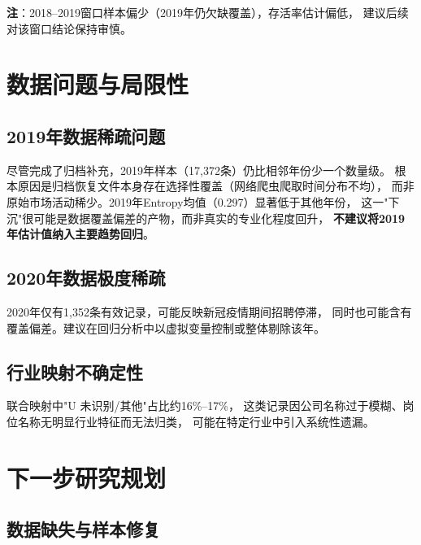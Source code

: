 \documentclass[12pt,a4paper]{ctexart}
\begin{document}
\textbf{注}：2018--2019窗口样本偏少（2019年仍欠缺覆盖），存活率估计偏低，
建议后续对该窗口结论保持审慎。

\section{数据问题与局限性}
\label{sec:data_issues}

\subsection{2019年数据稀疏问题}

尽管完成了归档补充，2019年样本（17,372条）仍比相邻年份少一个数量级。
根本原因是归档恢复文件本身存在选择性覆盖（网络爬虫爬取时间分布不均），
而非原始市场活动稀少。2019年Entropy均值（0.297）显著低于其他年份，
这一"下沉"很可能是数据覆盖偏差的产物，而非真实的专业化程度回升，
\textbf{不建议将2019年估计值纳入主要趋势回归}。

\subsection{2020年数据极度稀疏}

2020年仅有1,352条有效记录，可能反映新冠疫情期间招聘停滞，
同时也可能含有覆盖偏差。建议在回归分析中以虚拟变量控制或整体剔除该年。

\subsection{行业映射不确定性}

联合映射中"U 未识别/其他"占比约16\%--17\%，
这类记录因公司名称过于模糊、岗位名称无明显行业特征而无法归类，
可能在特定行业中引入系统性遗漏。

\section{下一步研究规划}
\label{sec:nextplan}

\subsection{数据缺失与样本修复}
\label{sec:plan_data}
\end{document}

